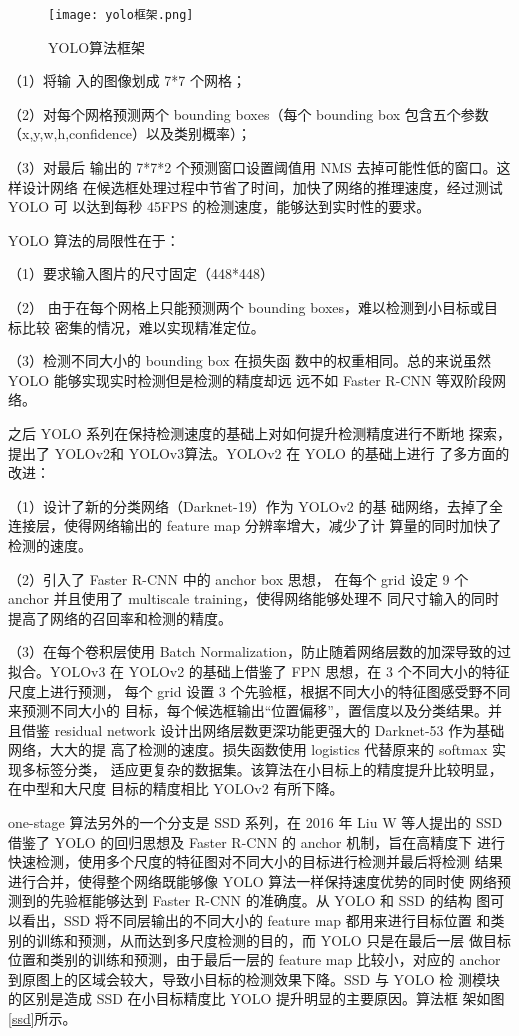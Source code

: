 \begin{figure}[htbp]
    \centering
    \texttt{[image: yolo框架.png]}
    \caption{YOLO算法框架}
    \label{yk}
\end{figure}

（1）将输
入的图像划成 7*7 个网格；

（2）对每个网格预测两个 bounding boxes（每个
bounding box 包含五个参数（x,y,w,h,confidence）以及类别概率）；

（3）对最后
输出的 7*7*2 个预测窗口设置阈值用 NMS 去掉可能性低的窗口。这样设计网络
在候选框处理过程中节省了时间，加快了网络的推理速度，经过测试 YOLO 可
以达到每秒 45FPS 的检测速度，能够达到实时性的要求。

YOLO 算法的局限性在于：

（1）要求输入图片的尺寸固定（448*448）

（2）
由于在每个网格上只能预测两个 bounding boxes，难以检测到小目标或目标比较
密集的情况，难以实现精准定位。

（3）检测不同大小的 bounding box 在损失函
数中的权重相同。总的来说虽然 YOLO 能够实现实时检测但是检测的精度却远
远不如 Faster R-CNN 等双阶段网络。

之后 YOLO 系列在保持检测速度的基础上对如何提升检测精度进行不断地
探索，提出了 YOLOv2\cite{redmon2017yolo9000}和 YOLOv3\cite{redmon2018yolov3}算法。YOLOv2 在 YOLO 的基础上进行
了多方面的改进：

（1）设计了新的分类网络（Darknet-19）作为 YOLOv2 的基
础网络，去掉了全连接层，使得网络输出的 feature map 分辨率增大，减少了计
算量的同时加快了检测的速度。

（2）引入了 Faster R-CNN 中的 anchor box 思想，
在每个 grid 设定 9 个 anchor 并且使用了 multiscale training，使得网络能够处理不
同尺寸输入的同时提高了网络的召回率和检测的精度。

（3）在每个卷积层使用
Batch Normalization，防止随着网络层数的加深导致的过拟合。YOLOv3 在
YOLOv2 的基础上借鉴了 FPN 思想，在 3 个不同大小的特征尺度上进行预测，
每个 grid 设置 3 个先验框，根据不同大小的特征图感受野不同来预测不同大小的
目标，每个候选框输出“位置偏移”，置信度以及分类结果。并且借鉴 residual
network 设计出网络层数更深功能更强大的 Darknet-53 作为基础网络，大大的提
高了检测的速度。损失函数使用 logistics 代替原来的 softmax 实现多标签分类，
适应更复杂的数据集。该算法在小目标上的精度提升比较明显，在中型和大尺度
目标的精度相比 YOLOv2 有所下降。

one-stage 算法另外的一个分支是 SSD 系列，在 2016 年 Liu W 等人提出的
SSD\cite{liu2016ssd}借鉴了 YOLO 的回归思想及 Faster R-CNN 的 anchor 机制，旨在高精度下
进行快速检测，使用多个尺度的特征图对不同大小的目标进行检测并最后将检测
结果进行合并，使得整个网络既能够像 YOLO 算法一样保持速度优势的同时使
网络预测到的先验框能够达到 Faster R-CNN 的准确度。从 YOLO 和 SSD 的结构
图可以看出，SSD 将不同层输出的不同大小的 feature map 都用来进行目标位置
和类别的训练和预测，从而达到多尺度检测的目的，而 YOLO 只是在最后一层
做目标位置和类别的训练和预测，由于最后一层的 feature map 比较小，对应的
anchor 到原图上的区域会较大，导致小目标的检测效果下降。SSD 与 YOLO 检
测模块的区别是造成 SSD 在小目标精度比 YOLO 提升明显的主要原因。算法框
架如图\ref{ssd}所示。

